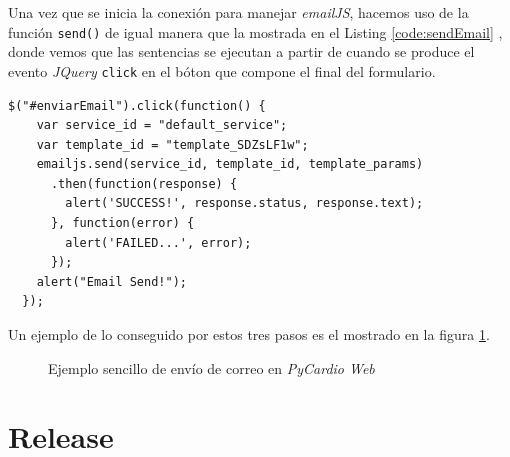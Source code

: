 Una vez que se inicia la conexión para manejar \textit{emailJS}, hacemos uso de la función \texttt{send()} de igual manera que la mostrada en el Listing \ref{code:sendEmail} , donde vemos que las sentencias se ejecutan a partir de cuando se produce el evento \textit{JQuery} \texttt{click} en el bóton que compone el final del formulario.

\begin{lstlisting}[caption=Código que produce el envío de correo,label={code:sendEmail}]
  $("#enviarEmail").click(function() {
    var service_id = "default_service";
    var template_id = "template_SDZsLF1w";
    emailjs.send(service_id, template_id, template_params)
      .then(function(response) {
        alert('SUCCESS!', response.status, response.text);
      }, function(error) {
        alert('FAILED...', error);
      });
    alert("Email Send!");
  });
\end{lstlisting}

Un ejemplo de lo conseguido por estos tres pasos es el mostrado en la figura \ref{fig:sendEmail}.

\begin{figure}[H]
    \centering
    \caption{Ejemplo sencillo de envío de correo en \textit{PyCardio Web}}
    \label{fig:sendEmail}
\end{figure}

\section{Release}
\label{sec:releaseWeb}

